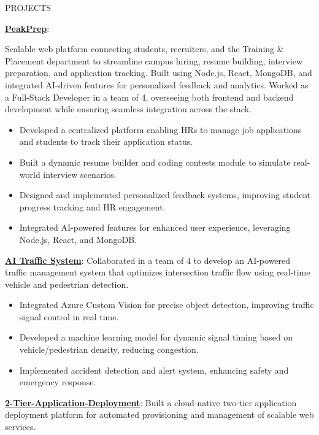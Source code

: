 \documentclass{resume} %
\begin{document}
\begin{rSection}{PROJECTS}
\vspace{-1.25em}
\item \textbf{\href{https://github.com/aditya-hansraj/PeakPrep}{PeakPrep}}: {Scalable web platform connecting students, recruiters, and the Training \& Placement department to streamline campus hiring, resume building, interview preparation, and application tracking. Built using Node.js, React, MongoDB, and integrated AI-driven features for personalized feedback and analytics. Worked as a Full-Stack Developer in a team of 4, overseeing both frontend and backend development while ensuring seamless integration across the stack.

}
\begin{itemize}
    \item Developed a centralized platform enabling HRs to manage job applications and students to track their application status.
    \item Built a dynamic resume builder and coding contests module to simulate real-world interview scenarios.
    \item Designed and implemented personalized feedback systems, improving student progress tracking and HR engagement.
    \item Integrated AI-powered features for enhanced user experience, leveraging Node.js, React, and MongoDB.
\end{itemize}
\smallskip
\item \textbf{\href{https://github.com/aditya-hansraj/trafficSystem}{AI Traffic System}}: Collaborated in a team of 4 to develop an AI-powered traffic management system that optimizes intersection traffic flow using real-time vehicle and pedestrian detection.
\begin{itemize}
    \item Integrated Azure Custom Vision for precise object detection, improving traffic signal control in real time.
    \item Developed a machine learning model for dynamic signal timing based on vehicle/pedestrian density, reducing congestion.
    \item Implemented accident detection and alert system, enhancing safety and emergency response.
\end{itemize}
\smallskip
\item \textbf{\href{https://github.com/aditya-hansraj/2-tier-application-deployment}{2-Tier-Application-Deployment}}: Built a cloud-native two-tier application deployment platform for automated provisioning and management of scalable web services.

\end{rSection}
\end{document}
